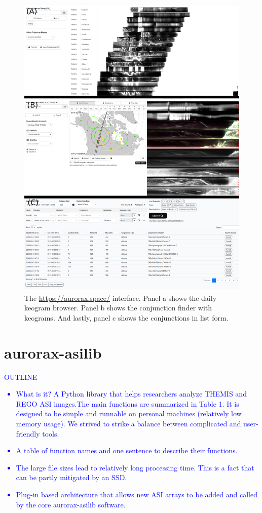 \documentclass[draft]{agujournal2019}
\begin{document}
\begin{figure}
      \includegraphics[width=\textwidth]{figures/fig1.png}
      \caption{The \url{https://aurorax.space/} interface. Panel a shows the daily keogram browser. Panel b shows the conjunction finder with keograms. And lastly, panel c shows the conjunctions in list form.}
      \label{fig1}
\end{figure}

\section{aurorax-asilib}\label{aurorax-asilib}
\textcolor{blue}{
      OUTLINE
      \begin{itemize}
            \item What is it? A Python library that helps researchers analyze THEMIS and REGO ASI images.The main functions are summarized in Table 1. It is designed to be simple and runnable on personal machines (relatively low memory usage). We strived to strike a balance between complicated and user-friendly tools.
            \item A table of function names and one sentence to describe their functions.
            \item The large file sizes lead to relatively long processing time. This is a fact that can be partly mitigated by an SSD. 
            \item Plug-in based architecture that allows new ASI arrays to be added and called by the core aurorax-asilib software.
      \end{itemize}
}
\end{document}
